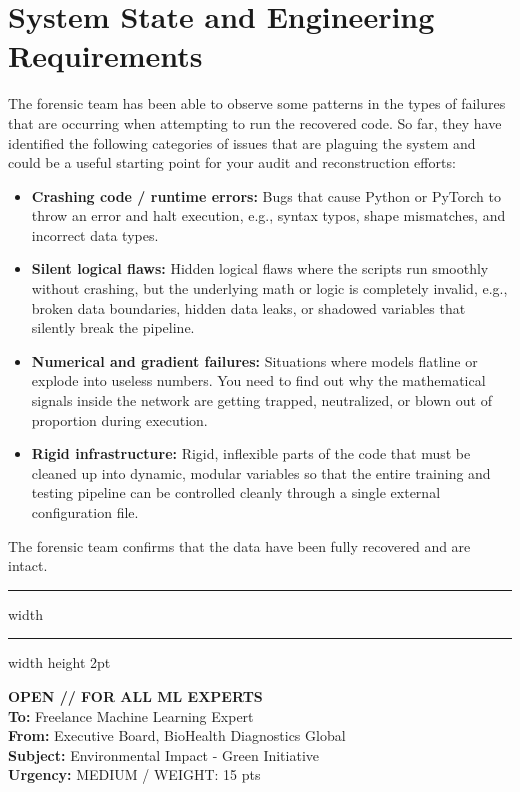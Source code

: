 \documentclass[11pt,a4paper]{article}
\begin{document}
\section*{System State and Engineering Requirements}
The forensic team has been able to observe some patterns in the types of failures that are occurring when attempting to run the recovered code. So far, they have identified the following categories of issues that are plaguing the system and could be a useful starting point for your audit and reconstruction efforts:
\begin{itemize}[nosep, noitemsep]
\item \textbf{Crashing code / runtime errors:} Bugs that cause Python or PyTorch to throw an error and halt execution, e.g., syntax typos, shape mismatches, and incorrect data types.
\item \textbf{Silent logical flaws:} Hidden logical flaws where the scripts run smoothly without crashing, but the underlying math or logic is completely invalid, e.g., broken data boundaries, hidden data leaks, or shadowed variables that silently break the pipeline.
\item \textbf{Numerical and gradient failures:} Situations where models flatline or explode into useless numbers. You need to find out why the mathematical signals inside the network are getting trapped, neutralized, or blown out of proportion during execution.
\item \textbf{Rigid infrastructure:} Rigid, inflexible parts of the code that must be cleaned up into dynamic, modular variables so that the entire training and testing pipeline can be controlled cleanly through a single external configuration file.
\end{itemize}
The forensic team confirms that the data have been fully recovered and are intact.

\vspace{0.4cm}
\hrule width \hsize \kern 1mm \hrule width \hsize height 2pt 

\vspace{0.3cm}

\noindent \textbf{OPEN // FOR ALL ML EXPERTS} \\
\textbf{To:} Freelance Machine Learning Expert \\
\textbf{From:} Executive Board, BioHealth Diagnostics Global \\
\textbf{Subject:} Environmental Impact - Green Initiative \\
\textbf{Urgency:} MEDIUM / WEIGHT: 15 pts
\end{document}

